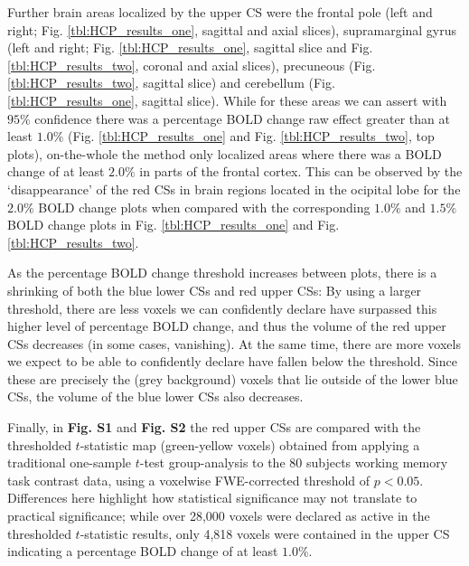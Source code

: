 Further brain areas localized by the upper CS were the frontal pole (left and right; Fig. \ref{tbl:HCP_results_one}, sagittal and axial slices), supramarginal gyrus (left and right; Fig. \ref{tbl:HCP_results_one}, sagittal slice and Fig. \ref{tbl:HCP_results_two}, coronal and axial slices), precuneous (Fig. \ref{tbl:HCP_results_two}, sagittal slice) and cerebellum (Fig. \ref{tbl:HCP_results_one}, sagittal slice). While for these areas we can assert with $95\%$ confidence there was a percentage BOLD change raw effect greater than at least $1.0\%$ (Fig. \ref{tbl:HCP_results_one} and Fig. \ref{tbl:HCP_results_two}, top plots), on-the-whole the method only localized areas where there was a BOLD change of at least $2.0\%$ in parts of the frontal cortex. This can be observed by the `disappearance' of the red CSs in brain regions located in the ocipital lobe for the $2.0\%$ BOLD change plots when compared with the corresponding $1.0\%$ and $1.5\%$ BOLD change plots in Fig. \ref{tbl:HCP_results_one} and Fig. \ref{tbl:HCP_results_two}. 

As the percentage BOLD change threshold increases between plots, there is a shrinking of both the blue lower CSs and red upper CSs: By using a larger threshold, there are less voxels we can confidently declare have surpassed this higher level of percentage BOLD change, and thus the volume of the red upper CSs decreases (in some cases, vanishing). At the same time, there are more voxels we expect to be able to confidently declare have fallen below the threshold. Since these are precisely the (grey background) voxels that lie outside of the lower blue CSs, the volume of the blue lower CSs also decreases. 

Finally, in \textbf{Fig. S1} and \textbf{Fig. S2} the red upper CSs are compared with the thresholded $t$-statistic map (green-yellow voxels) obtained from applying a traditional one-sample $t$-test group-analysis to the 80 subjects working memory task contrast data, using a voxelwise FWE-corrected threshold of $p < 0.05$. Differences here highlight how statistical significance may not translate to practical significance; while over 28,000 voxels were declared as active in the thresholded $t$-statistic results, only 4,818 voxels were contained in the upper CS indicating a percentage BOLD change of at least $1.0\%$. 

